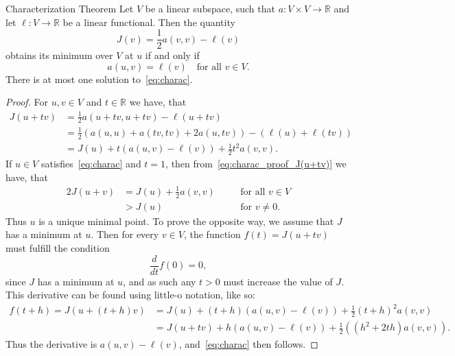 
\begin{thmx}{Characterization Theorem}
    Let $V$ be a linear subspace, such that
        \(
            a: V \times V \rightarrow \mathbb{R}
        \) and
     let
        \(
            \ell: V \rightarrow \mathbb{R}
        \)
    be a linear functional. Then the quantity
        \[
            J(v)=\frac{1}{2} a(v,v) - \ell(v)
        \]
    obtains its minimum over $V$ at $u$ if and only if
        \begin{equation}
            a(u,v) = \ell(v) \quad \text{for all } v \in V.
        \label{eq:charac}
        \end{equation}
    There is at most one solution to~\eqref{eq:charac}.
\label{thm:charac_theorem}
\end{thmx}

\begin{proof}
    For $u,v \in V$ and $t \in \mathbb{R}$ we have, that
    \begin{align}
        J(u+tv) &= \frac{1}{2} a(u+tv,u+tv) - \ell(u+tv) \nonumber \\
        &= \frac{1}{2} \left( a(u,u) + a(tv,tv) + 2a(u,tv) \right) - \left(  \ell(u) + \ell(tv)\right) \nonumber \\
        &= J(u) + t\left( a(u,v) - \ell(v) \right) + \frac{1}{2}t^2a(v,v). \label{eq:charac_proof_J(u+tv)}
    \end{align}
    If $u \in V$ satisfies~\eqref{eq:charac} and $t=1$, then from~\eqref{eq:charac_proof_J(u+tv)} we have, that
    \begin{alignat}{2}
        J(u+v) &= J(u) + \frac{1}{2}a(v,v) \quad &&\text{for all } v\in V  \nonumber \\
        &> J(u) \quad &&\text{for } v \neq 0.
    \end{alignat}
    Thus $u$ is a unique minimal point. 
    To prove the opposite way, we assume that $J$ has a minimum at $u$.
    Then for every $v\in V$, the function $f(t)= J(u+tv)$ must fulfill the condition
    \begin{equation*}
        \frac{d}{dt}f(0) = 0,
    \end{equation*}
    since $J$ has a minimum at $u$, and as such any $t>0$ must increase the 
    value of $J$.
    This derivative can be found using little-o notation, like so:
    \begin{align*}
          f(t+h) = J(u+(t+h)v) &= J(u) + (t+h) (a(u,v) - \ell(v)) + \frac{1}{2}(t+h)^2 a(v,v) \\
          &= J(u+tv) + h(a(u,v) - \ell(v)) + \frac{1}{2}((h^2+2th)a(v,v)).
    \end{align*}
    Thus the derivative is $a(u,v) - \ell(v)$, and~\eqref{eq:charac} then follows.
\end{proof}
